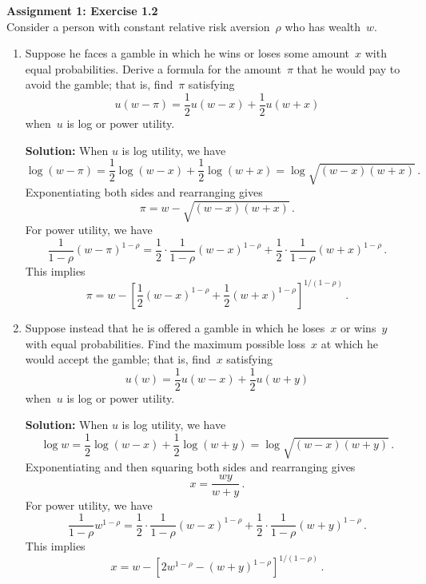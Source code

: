 \documentclass[11pt]{article}
\newcommand{\sol}{\textbf{Solution:} \hspace{2ex}}
\theoremstyle{definition}
\begin{document}
\VerbatimFootnotes
\noindent \textbf{Assignment 1: Exercise 1.2}\\
\noindent Consider a person with constant relative risk aversion~$\rho$ who has wealth~$w$.
\begin{enumerate}\renewcommand{\labelenumi}{(\alph{enumi})}
\item Suppose he faces a gamble in which he wins or loses some amount~$x$ with equal probabilities.  Derive a formula for the amount~$\pi$ that he would pay to avoid the gamble; that is, find~$\pi$ satisfying
$$u(w-\pi) = \frac{1}{2}u(w-x) + \frac{1}{2}u(w+x)$$
when~$u$ is log or power utility.  

\sol When $u$ is log utility, we have
$$\log (w-\pi) = \frac{1}{2}\log (w-x) + \frac{1}{2} \log (w+x) = \log \sqrt{(w-x)(w+x)}\,.$$
Exponentiating both sides and rearranging gives
$$\pi = w - \sqrt{(w-x)(w+x)}\,.$$
For power utility, we have
$$\frac{1}{1-\rho}(w-\pi)^{1-\rho} = \frac{1}{2}\cdot \frac{1}{1-\rho}(w-x)^{1-\rho} + \frac{1}{2}\cdot \frac{1}{1-\rho}(w+x)^{1-\rho}\,.$$
This implies
$$\pi = w - \left[\frac{1}{2}(w-x)^{1-\rho} + \frac{1}{2}(w+x)^{1-\rho}\right]^{1/(1-\rho)}\,.$$

\item Suppose instead that he is offered a gamble in which he loses~$x$ or wins~$y$ with equal probabilities.  Find the maximum possible loss~$x$ at which he would accept the gamble; that is, find~$x$ satisfying
$$u(w) = \frac{1}{2}u(w-x) + \frac{1}{2}u(w+y)$$
when~$u$ is log or power utility.

\sol When $u$ is log utility, we have
$$\log w = \frac{1}{2}\log (w-x) + \frac{1}{2} \log (w+y) = \log \sqrt{(w-x)(w+y)}\,.$$
Exponentiating and then squaring both sides and rearranging gives
$$x = \frac{wy}{w+y}\,.$$
For power utility, we have
$$\frac{1}{1-\rho}w^{1-\rho} = \frac{1}{2}\cdot \frac{1}{1-\rho}(w-x)^{1-\rho} + \frac{1}{2}\cdot \frac{1}{1-\rho}(w+y)^{1-\rho}\,.$$
This implies
$$x = w - \left[2w^{1-\rho} - (w+y)^{1-\rho}\right]^{1/(1-\rho)}\,.$$


\end{enumerate}
\end{document}
